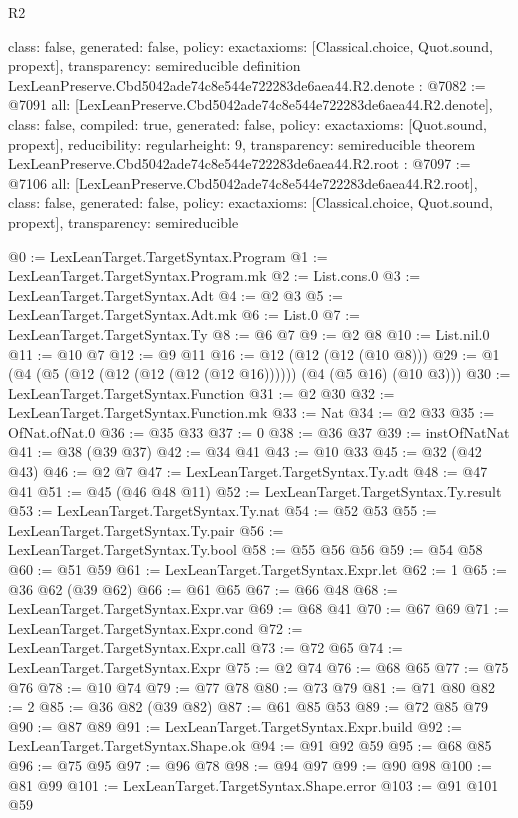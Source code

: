 \begin{lexlean}{R2}
\begin{coremodule}
{  class: false,
  generated: false,
  policy: exact{axioms: [Classical.choice, Quot.sound, propext]},
  transparency: semireducible
}
definition LexLeanPreserve.Cbd5042ade74c8e544e722283de6aea44.R2.denote : @7082 := @7091 {
  all: [LexLeanPreserve.Cbd5042ade74c8e544e722283de6aea44.R2.denote],
  class: false,
  compiled: true,
  generated: false,
  policy: exact{axioms: [Quot.sound, propext]},
  reducibility: regular{height: 9},
  transparency: semireducible
}
theorem LexLeanPreserve.Cbd5042ade74c8e544e722283de6aea44.R2.root : @7097 := @7106 {
  all: [LexLeanPreserve.Cbd5042ade74c8e544e722283de6aea44.R2.root],
  class: false,
  generated: false,
  policy: exact{axioms: [Classical.choice, Quot.sound, propext]},
  transparency: semireducible
}

@0 := LexLeanTarget.TargetSyntax.Program
@1 := LexLeanTarget.TargetSyntax.Program.mk
@2 := List.cons.{0}
@3 := LexLeanTarget.TargetSyntax.Adt
@4 := @2 @3
@5 := LexLeanTarget.TargetSyntax.Adt.mk
@6 := List.{0}
@7 := LexLeanTarget.TargetSyntax.Ty
@8 := @6 @7
@9 := @2 @8
@10 := List.nil.{0}
@11 := @10 @7
@12 := @9 @11
@16 := @12 (@12 (@12 (@10 @8)))
@29 := @1 (@4 (@5 (@12 (@12 (@12 (@12 (@12 @16)))))) (@4 (@5 @16) (@10 @3)))
@30 := LexLeanTarget.TargetSyntax.Function
@31 := @2 @30
@32 := LexLeanTarget.TargetSyntax.Function.mk
@33 := Nat
@34 := @2 @33
@35 := OfNat.ofNat.{0}
@36 := @35 @33
@37 := 0
@38 := @36 @37
@39 := instOfNatNat
@41 := @38 (@39 @37)
@42 := @34 @41
@43 := @10 @33
@45 := @32 (@42 @43)
@46 := @2 @7
@47 := LexLeanTarget.TargetSyntax.Ty.adt
@48 := @47 @41
@51 := @45 (@46 @48 @11)
@52 := LexLeanTarget.TargetSyntax.Ty.result
@53 := LexLeanTarget.TargetSyntax.Ty.nat
@54 := @52 @53
@55 := LexLeanTarget.TargetSyntax.Ty.pair
@56 := LexLeanTarget.TargetSyntax.Ty.bool
@58 := @55 @56 @56
@59 := @54 @58
@60 := @51 @59
@61 := LexLeanTarget.TargetSyntax.Expr.let
@62 := 1
@65 := @36 @62 (@39 @62)
@66 := @61 @65
@67 := @66 @48
@68 := LexLeanTarget.TargetSyntax.Expr.var
@69 := @68 @41
@70 := @67 @69
@71 := LexLeanTarget.TargetSyntax.Expr.cond
@72 := LexLeanTarget.TargetSyntax.Expr.call
@73 := @72 @65
@74 := LexLeanTarget.TargetSyntax.Expr
@75 := @2 @74
@76 := @68 @65
@77 := @75 @76
@78 := @10 @74
@79 := @77 @78
@80 := @73 @79
@81 := @71 @80
@82 := 2
@85 := @36 @82 (@39 @82)
@87 := @61 @85 @53
@89 := @72 @85 @79
@90 := @87 @89
@91 := LexLeanTarget.TargetSyntax.Expr.build
@92 := LexLeanTarget.TargetSyntax.Shape.ok
@94 := @91 @92 @59
@95 := @68 @85
@96 := @75 @95
@97 := @96 @78
@98 := @94 @97
@99 := @90 @98
@100 := @81 @99
@101 := LexLeanTarget.TargetSyntax.Shape.error
@103 := @91 @101 @59

\end{coremodule}
\end{lexlean}
